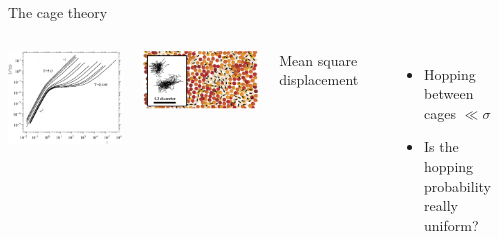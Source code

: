 \begin{frame}{The cage theory}
	\begin{columns}
	\centering
	\includegraphics[width=\columnwidth]{msd_kob}
	
	\includegraphics[width=\columnwidth]{cage_weeks}
	
	Mean square displacement\\
	\begin{footnotesize}\end{footnotesize}
	
	\bigskip
	\begin{itemize}
		\item Hopping between cages $\ll\sigma$
		\item Is the hopping probability really uniform?
	\end{itemize}
	
	\bigskip
	\begin{footnotesize}\end{footnotesize}
	\end{columns}
\end{frame}

